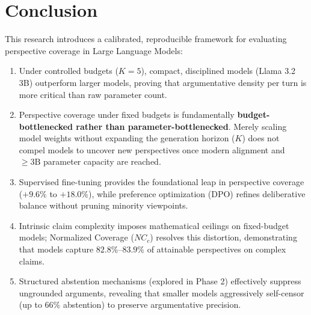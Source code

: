 \documentclass[11pt,a4paper]{article}
\begin{document}
\section{Conclusion}
\label{sec:conclusion}

This research introduces a calibrated, reproducible framework for evaluating perspective coverage in Large Language Models:
\begin{enumerate}[leftmargin=*,itemsep=1pt]
    \item Under controlled budgets ($K = 5$), compact, disciplined models (Llama 3.2 3B) outperform larger models, proving that argumentative density per turn is more critical than raw parameter count.
    \item Perspective coverage under fixed budgets is fundamentally \textbf{budget-bottlenecked rather than parameter-bottlenecked}. Merely scaling model weights without expanding the generation horizon ($K$) does not compel models to uncover new perspectives once modern alignment and $\ge 3\text{B}$ parameter capacity are reached.
    \item Supervised fine-tuning provides the foundational leap in perspective coverage ($+9.6\%$ to $+18.0\%$), while preference optimization (DPO) refines deliberative balance without pruning minority viewpoints.
    \item Intrinsic claim complexity imposes mathematical ceilings on fixed-budget models; Normalized Coverage ($NC_c$) resolves this distortion, demonstrating that models capture $82.8\%$--$83.9\%$ of attainable perspectives on complex claims.
    \item Structured abstention mechanisms (explored in Phase 2) effectively suppress ungrounded arguments, revealing that smaller models aggressively self-censor (up to $66\%$ abstention) to preserve argumentative precision.
\end{enumerate}
\end{document}
